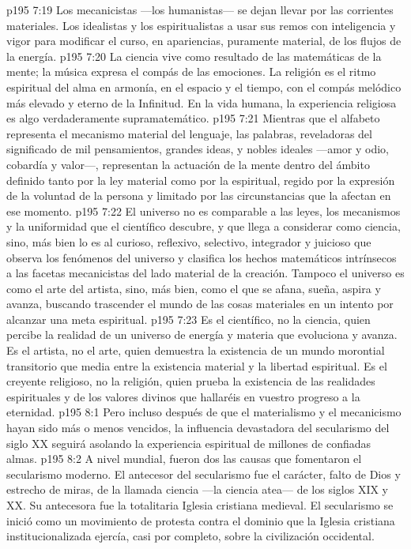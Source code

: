 \vs p195 7:19 \pc Los mecanicistas ---los humanistas--- se dejan llevar por las corrientes materiales. Los idealistas y los espiritualistas  a usar sus remos con inteligencia y vigor para modificar el curso, en apariencias, puramente material, de los flujos de la energía.
\vs p195 7:20 \pc La ciencia vive como resultado de las matemáticas de la mente; la música expresa el compás de las emociones. La religión es el ritmo espiritual del alma en armonía, en el espacio y el tiempo, con el compás melódico más elevado y eterno de la Infinitud. En la vida humana, la experiencia religiosa es algo verdaderamente supramatemático.
\vs p195 7:21 Mientras que el alfabeto representa el mecanismo material del lenguaje, las palabras, reveladoras del significado de mil pensamientos, grandes ideas, y nobles ideales ---amor y odio, cobardía y valor---, representan la actuación de la mente dentro del ámbito definido tanto por la ley material como por la espiritual, regido por la expresión de la voluntad de la persona y limitado por las circunstancias que la afectan en ese momento.
\vs p195 7:22 El universo no es comparable a las leyes, los mecanismos y la uniformidad que el científico descubre, y que llega a considerar como ciencia, sino, más bien lo es al  curioso, reflexivo, selectivo, integrador y juicioso que observa los fenómenos del universo y clasifica los hechos matemáticos intrínsecos a las facetas mecanicistas del lado material de la creación. Tampoco el universo es como el arte del artista, sino, más bien, como el  que se afana, sueña, aspira y avanza, buscando trascender el mundo de las cosas materiales en un intento por alcanzar una meta espiritual.
\vs p195 7:23 Es el científico, no la ciencia, quien percibe la realidad de un universo de energía y materia que evoluciona y avanza. Es el artista, no el arte, quien demuestra la existencia de un mundo morontial transitorio que media entre la existencia material y la libertad espiritual. Es el creyente religioso, no la religión, quien prueba la existencia de las realidades espirituales y de los valores divinos que hallaréis en vuestro progreso a la eternidad.
\vs p195 8:1 Pero incluso después de que el materialismo y el mecanicismo hayan sido más o menos vencidos, la influencia devastadora del secularismo del siglo XX seguirá asolando la experiencia espiritual de millones de confiadas almas.
\vs p195 8:2 A nivel mundial, fueron dos las causas que fomentaron el secularismo moderno. El antecesor del secularismo fue el carácter, falto de Dios y estrecho de miras, de la llamada ciencia ---la ciencia atea--- de los siglos XIX y XX. Su antecesora fue la totalitaria Iglesia cristiana medieval. El secularismo se inició como un movimiento de protesta contra el dominio que la Iglesia cristiana institucionalizada ejercía, casi por completo, sobre la civilización occidental.

